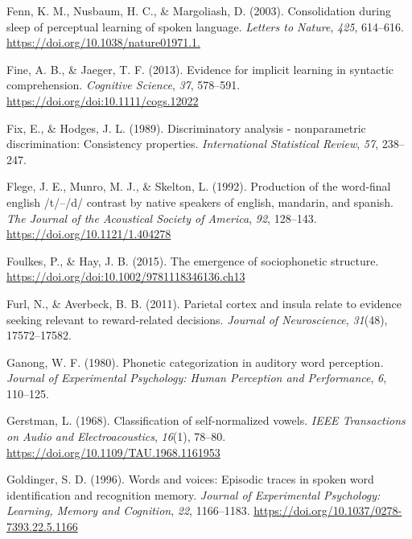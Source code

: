 \documentclass[
  11pt,
  man,floatsintext]{apa6}
\newlength{\cslhangindent}
\newlength{\cslentryspacingunit} %
\newenvironment{CSLReferences}[2] %
 {%
  \setlength{\parindent}{0pt}
  \ifodd #1
  \let\oldpar\par
  \def\par{\hangindent=\cslhangindent\oldpar}
  \fi
  \setlength{\parskip}{#2\cslentryspacingunit}
 }%
 {}
\begin{document}
\begin{CSLReferences}{1}{0}
\leavevmode{}%
Fenn, K. M., Nusbaum, H. C., \& Margoliash, D. (2003). Consolidation during sleep of perceptual learning of spoken language. \emph{Letters to Nature}, \emph{425}, 614--616. \url{https://doi.org/10.1038/nature01971.1.}

\leavevmode{}%
Fine, A. B., \& Jaeger, T. F. (2013). Evidence for implicit learning in syntactic comprehension. \emph{Cognitive Science}, \emph{37}, 578--591. \url{https://doi.org/doi:10.1111/cogs.12022}

\leavevmode{}%
Fix, E., \& Hodges, J. L. (1989). Discriminatory analysis - nonparametric discrimination: Consistency properties. \emph{International Statistical Review}, \emph{57}, 238--247.

\leavevmode{}%
Flege, J. E., Munro, M. J., \& Skelton, L. (1992). Production of the word‐final english /t/--/d/ contrast by native speakers of english, mandarin, and spanish. \emph{The Journal of the Acoustical Society of America}, \emph{92}, 128--143. \url{https://doi.org/10.1121/1.404278}

\leavevmode{}%
Foulkes, P., \& Hay, J. B. (2015). The emergence of sociophonetic structure. \url{https://doi.org/doi:10.1002/9781118346136.ch13}

\leavevmode{}%
Furl, N., \& Averbeck, B. B. (2011). Parietal cortex and insula relate to evidence seeking relevant to reward-related decisions. \emph{Journal of Neuroscience}, \emph{31}(48), 17572--17582.

\leavevmode{}%
Ganong, W. F. (1980). Phonetic categorization in auditory word perception. \emph{Journal of Experimental Psychology: Human Perception and Performance}, \emph{6}, 110--125.

\leavevmode{}%
Gerstman, L. (1968). Classification of self-normalized vowels. \emph{IEEE Transactions on Audio and Electroacoustics}, \emph{16}(1), 78--80. \url{https://doi.org/10.1109/TAU.1968.1161953}

\leavevmode{}%
Goldinger, S. D. (1996). Words and voices: Episodic traces in spoken word identification and recognition memory. \emph{Journal of Experimental Psychology: Learning, Memory and Cognition}, \emph{22}, 1166--1183. \url{https://doi.org/10.1037/0278-7393.22.5.1166}


\end{CSLReferences}
\end{document}
